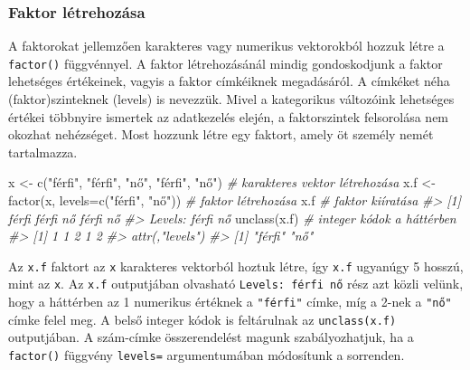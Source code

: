 \documentclass[
]{book}
\newenvironment{Shaded}{\begin{snugshade}}{\end{snugshade}}
\newcommand{\AttributeTok}[1]{\textcolor[rgb]{0.77,0.63,0.00}{#1}}
\newcommand{\CommentTok}[1]{\textcolor[rgb]{0.56,0.35,0.01}{\textit{#1}}}
\newcommand{\FunctionTok}[1]{\textcolor[rgb]{0.00,0.00,0.00}{#1}}
\newcommand{\NormalTok}[1]{#1}
\newcommand{\OtherTok}[1]{\textcolor[rgb]{0.56,0.35,0.01}{#1}}
\newcommand{\StringTok}[1]{\textcolor[rgb]{0.31,0.60,0.02}{#1}}
\begin{document}
\hypertarget{faktor-luxe9trehozuxe1sa}{%
\subsubsection{Faktor létrehozása}\label{faktor-luxe9trehozuxe1sa}}

A faktorokat jellemzően karakteres vagy numerikus vektorokból hozzuk létre a \texttt{factor()} függvénnyel. A faktor létrehozásánál mindig gondoskodjunk a faktor lehetséges értékeinek, vagyis a faktor címkéiknek megadásáról. A címkéket néha (faktor)szinteknek (levels) is nevezzük. Mivel a kategorikus változóink lehetséges értékei többnyire ismertek az adatkezelés elején, a faktorszintek felsorolása nem okozhat nehézséget. Most hozzunk létre egy faktort, amely öt személy nemét tartalmazza.

\begin{Shaded}
\begin{Highlighting}[]
\NormalTok{x }\OtherTok{\textless{}{-}} \FunctionTok{c}\NormalTok{(}\StringTok{"férfi"}\NormalTok{, }\StringTok{"férfi"}\NormalTok{, }\StringTok{"nő"}\NormalTok{, }\StringTok{"férfi"}\NormalTok{, }\StringTok{"nő"}\NormalTok{)  }\CommentTok{\# karakteres vektor létrehozása}
\NormalTok{x.f }\OtherTok{\textless{}{-}} \FunctionTok{factor}\NormalTok{(x, }\AttributeTok{levels=}\FunctionTok{c}\NormalTok{(}\StringTok{"férfi"}\NormalTok{, }\StringTok{"nő"}\NormalTok{))      }\CommentTok{\# faktor létrehozása}
\NormalTok{x.f                                            }\CommentTok{\# faktor kiíratása}
\CommentTok{\#\textgreater{} [1] férfi férfi nő    férfi nő   }
\CommentTok{\#\textgreater{} Levels: férfi nő}
\FunctionTok{unclass}\NormalTok{(x.f)                                   }\CommentTok{\# integer kódok a háttérben}
\CommentTok{\#\textgreater{} [1] 1 1 2 1 2}
\CommentTok{\#\textgreater{} attr(,"levels")}
\CommentTok{\#\textgreater{} [1] "férfi" "nő"}
\end{Highlighting}
\end{Shaded}

Az \texttt{x.f} faktort az \texttt{x} karakteres vektorból hoztuk létre, így \texttt{x.f} ugyanúgy 5 hosszú, mint az \texttt{x}. Az \texttt{x.f} outputjában olvasható \texttt{Levels:\ férfi\ nő} rész azt közli velünk, hogy a háttérben az 1 numerikus értéknek a \texttt{"férfi"} címke, míg a 2-nek a \texttt{"nő"} címke felel meg. A belső integer kódok is feltárulnak az \texttt{unclass(x.f)} outputjában. A szám-címke összerendelést magunk szabályozhatjuk, ha a \texttt{factor()} függvény \texttt{levels=} argumentumában módosítunk a sorrenden.
\end{document}

